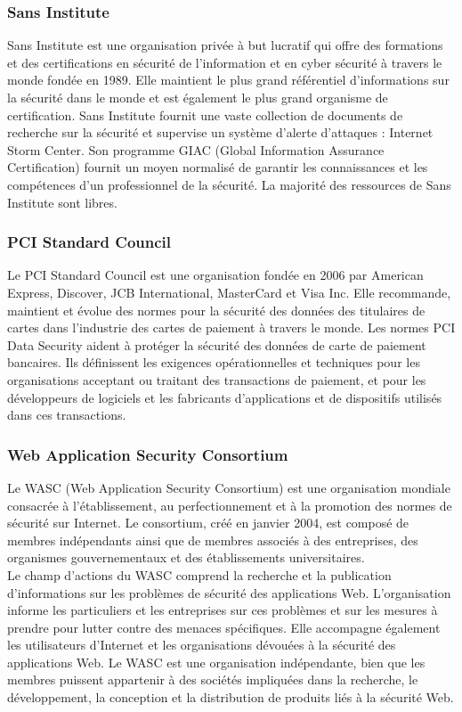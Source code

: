 \subsubsection{Sans Institute}
Sans Institute est une organisation privée à but lucratif qui offre des formations et des certifications en sécurité de l'information et en cyber sécurité à travers le monde fondée en 1989. Elle maintient le plus grand référentiel d'informations sur la sécurité dans le monde et est également le plus grand organisme de certification. Sans Institute fournit une vaste collection de documents de recherche sur la sécurité et supervise un système d’alerte d’attaques : Internet Storm Center. Son programme GIAC (Global Information Assurance Certification) fournit un moyen normalisé de garantir les connaissances et les compétences d'un professionnel de la sécurité. La majorité des ressources de Sans Institute sont libres.\\

\subsubsection{PCI Standard Council}
Le PCI Standard Council est une organisation fondée en 2006 par American Express, Discover, JCB International, MasterCard et Visa Inc. Elle recommande, maintient et évolue des normes pour la sécurité des données des titulaires de cartes dans l'industrie des cartes de paiement à travers le monde. Les normes PCI Data Security aident à protéger la sécurité des données de carte de paiement bancaires. Ils définissent les exigences opérationnelles et techniques pour les organisations acceptant ou traitant des transactions de paiement, et pour les développeurs de logiciels et les fabricants d'applications et de dispositifs utilisés dans ces transactions.

\subsubsection{Web Application Security Consortium}
Le WASC (Web Application Security Consortium) est une organisation mondiale consacrée à l'établissement, au perfectionnement et à la promotion des normes de sécurité sur Internet. Le consortium, créé en janvier 2004, est composé de membres indépendants ainsi que de membres associés à des entreprises, des organismes gouvernementaux et des établissements universitaires.\\
Le champ d'actions du WASC comprend la recherche et la publication d'informations sur les problèmes de sécurité des applications Web. L’organisation informe les particuliers et les entreprises sur ces problèmes et sur les mesures à prendre pour lutter contre des menaces spécifiques. Elle accompagne également les utilisateurs d’Internet et les organisations dévouées à la sécurité des applications Web. Le WASC est une organisation indépendante, bien que les membres puissent appartenir à des sociétés impliquées dans la recherche, le développement, la conception et la distribution de produits liés à la sécurité Web.\\

